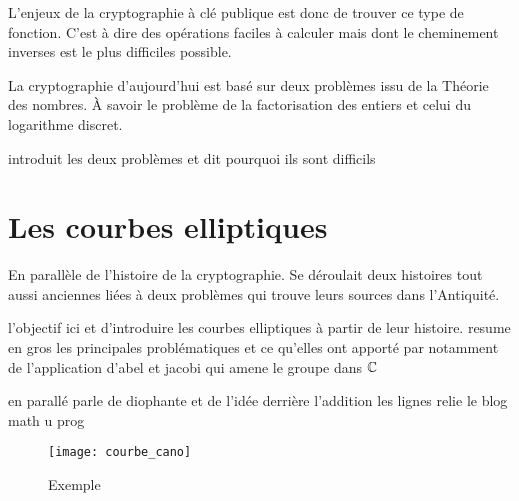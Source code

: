 L'enjeux de la cryptographie à clé publique est donc de trouver ce type de fonction.
C'est à dire des opérations faciles à calculer mais dont le cheminement inverses est le plus
difficiles possible.

La cryptographie d'aujourd'hui est basé sur deux problèmes issu de la Théorie des nombres. À
savoir le problème de la factorisation des entiers et celui du logarithme discret.

introduit les deux problèmes et dit pourquoi ils sont difficils


\section{Les courbes elliptiques}

En parallèle de l'histoire de la cryptographie. Se déroulait deux histoires tout aussi
anciennes liées à deux problèmes qui trouve leurs sources dans l'Antiquité.

l'objectif ici et d'introduire les courbes elliptiques à partir de leur histoire. resume en
gros les principales problématiques et ce qu'elles ont apporté par notamment de l'application
d'abel et jacobi qui amene le groupe dans $\mathbb{C}$ 

en parallé parle de diophante et de l'idée derrière l'addition les lignes relie le blog math u
prog




\begin{figure}[h]
    \centering
    \texttt{[image: courbe\_cano]}
    \caption{Exemple}
    \label{fig:c-c}
\end{figure}








